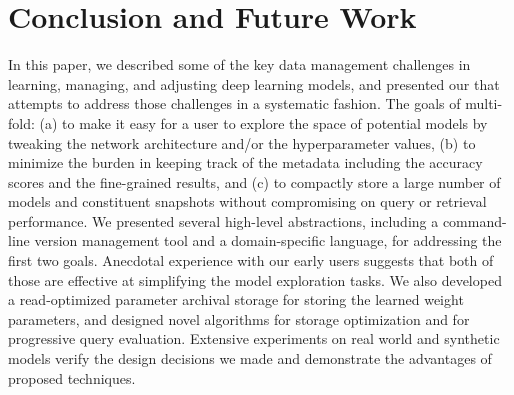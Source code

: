 \documentclass[conference]{IEEEtran}
\begin{document}
\section{Conclusion and Future Work}
\label{sec:concolusion}
In this paper, we described some of the key data management challenges in learning, managing, and adjusting 
deep learning models, and presented our \modelhub\system that attempts to address those challenges in a systematic
fashion. The goals of \modelhub\are multi-fold: (a) to make it easy for a user to explore the space of 
potential models by tweaking the network architecture and/or the hyperparameter values, (b) to minimize the burden
in keeping track of the metadata including the accuracy scores and the fine-grained results, and (c) to compactly store
a large number of models and constituent snapshots without compromising on query or retrieval performance. 
We presented several high-level abstractions, including a command-line version management tool and a domain-specific
language, for addressing the first two goals. Anecdotal experience with our early users suggests that both of those are 
effective at simplifying the model exploration tasks. We also developed a read-optimized parameter archival storage for 
storing the learned weight parameters, and designed novel algorithms for storage optimization and for progressive query 
evaluation. Extensive experiments on real world and synthetic models verify the design decisions we made and demonstrate 
the advantages of proposed techniques.



\balance

\eat{
{\small


}
}


\def\IEEEbibitemsep{1pt}

\end{document}
